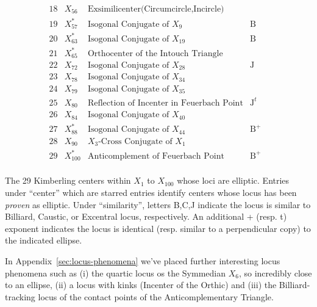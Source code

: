 \begin{table}[ht]
$$\begin{array}{cclcc}
 18 & X_{56} & \text{Exsimilicenter(Circumcircle,Incircle)} &  \\
 19 & X_{57}^* & \text{Isogonal Conjugate of $X_{9}$} &\text{B} \\
 20 & X_{63}^* & \text{Isogonal Conjugate of $X_{19}$} &\text{B} \\
 21 & X_{65}^* & \text{Orthocenter of the Intouch Triangle} & &\\
 22 & X_{72} & \text{Isogonal Conjugate of $X_{28}$} & \text{J}\\
 23 & X_{78} & \text{Isogonal Conjugate of $X_{34}$} & \\
 24 & X_{79} & \text{Isogonal Conjugate of $X_{35}$} & \\
 25 & X_{80} & \text{Reflection of Incenter in Feuerbach Point} &  \text{J}^t \\
 26 & X_{84} & \text{Isogonal Conjugate of $X_{40}$} & \\
 27 & X_{88}^* & \text{Isogonal Conjugate of $X_{44}$} &  \text{B}^+ \\
 28 & X_{90} & \text{$X_{3}$-Cross Conjugate of $X_{1}$} & \\
 29 & X_{100}^* & \text{Anticomplement of Feuerbach Point} & \text{B}^+\\
\end{array}
$$
\caption{The 29 Kimberling centers within $X_1$ to $X_{100}$ whose loci are elliptic. Entries under ``center'' which are starred entries identify centers whose locus has been {\em proven} as elliptic. Under ``similarity'', letters B,C,J indicate the locus is similar to Billiard, Caustic, or Excentral locus, respectively. An additional {+}  (resp. {t}) exponent indicates the locus is identical (resp. similar to a perpendicular copy) to the indicated ellipse.}
\end{table}

In Appendix~\ref{sec:locus-phenomena} we've placed further interesting locus phenomena such as (i) the quartic locus os the Symmedian $X_6$, so incredibly close to an ellipse, (ii) a locus with kinks (Incenter of the Orthic) and (iii) the Billiard-tracking locus of the contact points of the Anticomplementary Triangle. 